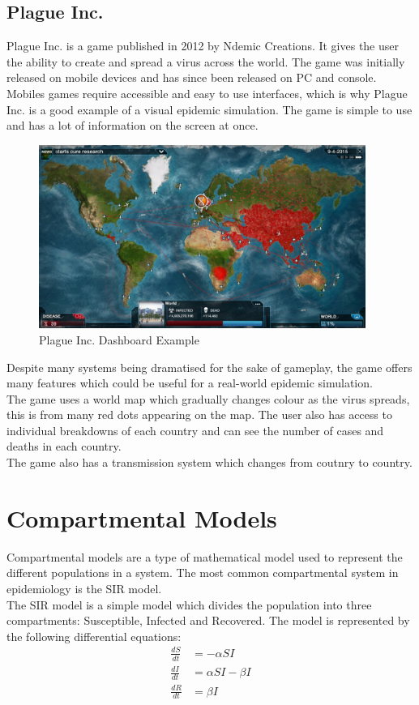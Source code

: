 \documentclass{report}
\begin{document}
\subsection{Plague Inc.}
Plague Inc. is a game published in 2012 by Ndemic Creations. It gives the user the ability to create and spread a virus across the world. The game was initially released on mobile devices and has since been released on PC and console.\\
Mobiles games require accessible and easy to use interfaces, which is why Plague Inc. is a good example of a visual epidemic simulation. The game is simple to use and has a lot of information on the screen at once.
\begin{center}
    \begin{figure}[h]
        \centering
        \includegraphics[width=0.95\textwidth]{Plague Inc Example.jpeg}
        \caption{Plague Inc. Dashboard Example}
        \label{fig:plagueinc_dashboard}
    \end{figure}
\end{center}
Despite many systems being dramatised for the sake of gameplay, the game offers many features which could be useful for a real-world epidemic simulation. \\
The game uses a world map which gradually changes colour as the virus spreads, this is from many red dots appearing on the map. The user also has access to individual breakdowns of each country and can see the number of cases and deaths in each country.\\ 
The game also has a transmission system which changes from coutnry to country. 

\section{Compartmental Models}
Compartmental models are a type of mathematical model used to represent the different populations in a system. The most common compartmental system in epidemiology is the SIR model.\\
The SIR model is a simple model which divides the population into three compartments: Susceptible, Infected and Recovered. The model is represented by the following differential equations:
\begin{align}
\frac{dS}{dt} &= -\alpha SI \\
\frac{dI}{dt} &= \alpha SI - \beta I \\
\frac{dR}{dt} &= \beta I
\end{align}
\cite{beckley2013modeling}
\end{document}
